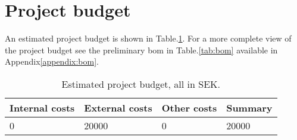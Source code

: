 \section{Project budget}
An estimated project budget is shown in Table.\:\ref{tab:estimated_budget}. For a more complete view of the project budget see the preliminary \ac{bom} in Table.\:\ref{tab:bom} available in Appendix\:\ref{appendix:bom}.
\label{section:project_budget}

\begin{table}[H]
    \begin{tabularx}{\columnwidth}{|X|X|X|X|}
        \hline
        Internal costs & External costs & Other costs & Summary \\ \hline
        0              & 20000           & 0           & 20000    \\ \hline
    \end{tabularx}
    \caption{Estimated project budget, all in SEK.}
    \label{tab:estimated_budget}
\end{table}


\begin{comment}
\helper{The project’s preliminary calculation – a  outline of internal and external costs for resources needed to execute the project.}

\begin{table}[H]
    \begin{tabularx}{\columnwidth}{|X|X|X|X|}
        \hline
        Internal costs & External costs & Other costs & Summary \\ \hline
                       &                &             &         \\ \hline
                       &                &             &         \\ \hline
                       &                &             &         \\ \hline
\end{tabularx}
\end{table}
\end{comment}

